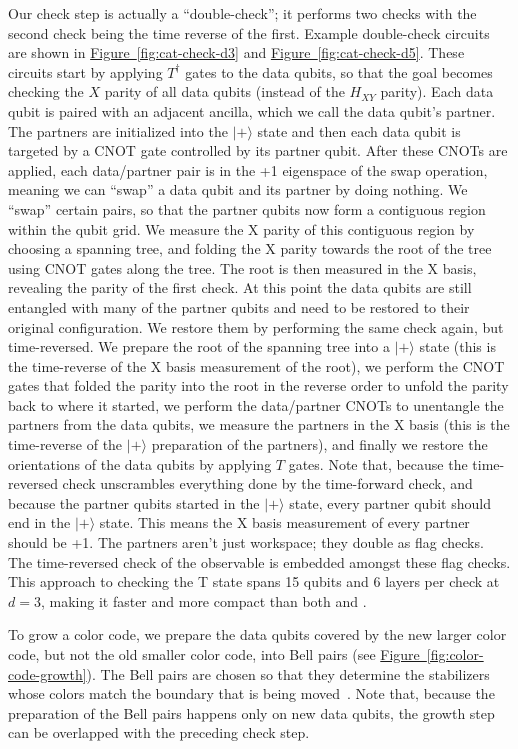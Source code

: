 \documentclass[onecolumn,unpublished,a4paper]{quantumarticle}
\theoremstyle{definition}
\newcommand{\fig}[1]{\hyperref[fig:#1]{Figure~\ref*{fig:#1}}}
\begin{document}
Our check step is actually a ``double-check''; it performs two checks with the second check being the time reverse of the first.
Example double-check circuits are shown in \fig{cat-check-d3} and \fig{cat-check-d5}.
These circuits start by applying $T^\dagger$ gates to the data qubits, so that the goal becomes checking the $X$ parity of all data qubits (instead of the $H_{XY}$ parity).
Each data qubit is paired with an adjacent ancilla, which we call the data qubit's partner.
The partners are initialized into the $|+\rangle$ state and then each data qubit is targeted by a CNOT gate controlled by its partner qubit.
After these CNOTs are applied, each data/partner pair is in the +1 eigenspace of the swap operation, meaning we can ``swap'' a data qubit and its partner by doing nothing.
We ``swap'' certain pairs, so that the partner qubits now form a contiguous region within the qubit grid.
We measure the X parity of this contiguous region by choosing a spanning tree, and folding the X parity towards the root of the tree using CNOT gates along the tree.
The root is then measured in the X basis, revealing the parity of the first check.
At this point the data qubits are still entangled with many of the partner qubits and need to be restored to their original configuration.
We restore them by performing the same check again, but time-reversed.
We prepare the root of the spanning tree into a $|+\rangle$ state (this is the time-reverse of the X basis measurement of the root), we perform the CNOT gates that folded the parity into the root in the reverse order to unfold the parity back to where it started, we perform the data/partner CNOTs to unentangle the partners from the data qubits, we measure the partners in the X basis (this is the time-reverse of the $|+\rangle$ preparation of the partners), and finally we restore the orientations of the data qubits by applying $T$ gates.
Note that, because the time-reversed check unscrambles everything done by the time-forward check, and because the partner qubits started in the $|+\rangle$ state, every partner qubit should end in the $|+\rangle$ state.
This means the X basis measurement of every partner should be +1.
The partners aren't just workspace; they double as flag checks.
The time-reversed check of the observable is embedded amongst these flag checks.
This approach to checking the T state spans 15 qubits and 6 layers per check at $d=3$, making it faster and more compact than both \cite{chamberland2020colorinjection} and \cite{hirano2024zeroleveldistill}.

To grow a color code, we prepare the data qubits covered by the new larger color code, but not the old smaller color code, into Bell pairs (see \fig{color-code-growth}).
The Bell pairs are chosen so that they determine the stabilizers whose colors match the boundary that is being moved~\cite{jones2016colorcode}.
Note that, because the preparation of the Bell pairs happens only on new data qubits, the growth step can be overlapped with the preceding check step.
\end{document}

